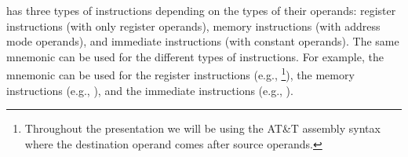 \ISA has three types of instructions depending on the types of their operands: register instructions (with only register operands), memory instructions (with address mode operands), and immediate instructions (with constant operands).
The same mnemonic can be used for the different types of instructions.
For example, the mnemonic  can be used for the register instructions (e.g., \footnote{Throughout the presentation we will be using the {AT\&T} assembly syntax~\cite{Syntax} where the destination operand comes after source operands.}), the memory instructions (e.g., ), and the immediate instructions (e.g., ).




